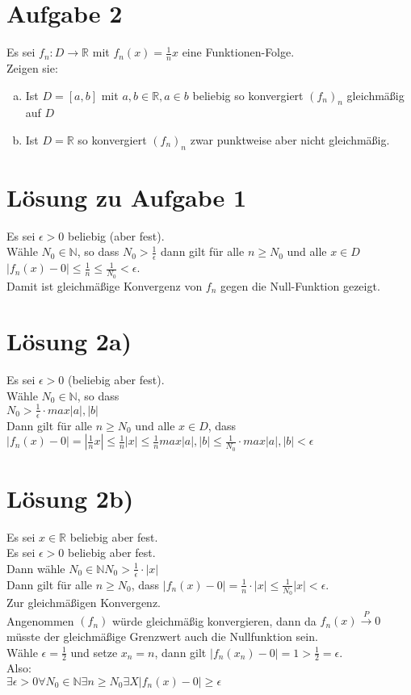\documentclass[11pt,a4paper]{article}
\begin{document}
		\section*{Aufgabe 2}
			Es sei $f_n:D\rightarrow\mathbb{R}$ mit $f_n(x) = \frac{1}{n}x$ eine Funktionen-Folge.\\
			Zeigen sie:\\
			\begin{enumerate}[a)]
				\item Ist $D=[a,b]$ mit $a,b\in \mathbb{R}, a\in b$ beliebig so konvergiert $(f_n)_n$ gleichmäßig auf $D$
				\item Ist $D=\mathbb{R}$ so konvergiert $(f_n)_n$ zwar punktweise aber nicht gleichmäßig.
			\end{enumerate}
		\section*{Lösung zu Aufgabe 1}
			Es sei $\epsilon >0$ beliebig (aber fest).\\
			 Wähle $N_0\in \mathbb{N}$, so dass $N_0>\frac{1}{\epsilon}$ dann gilt für alle $n\geq N_0$ und alle $x\in D$ $|f_n(x)-0|\leq\frac{1}{n}\leq\frac{1}{N_0}<\epsilon$.\\
			Damit ist gleichmäßige Konvergenz von $f_n$ gegen die Null-Funktion gezeigt.\\
		\section*{Lösung 2a)}
			Es sei $\epsilon > 0$ (beliebig aber fest).\\
			Wähle $N_0\in \mathbb{N}$, so dass\\
			$N_0>\frac{1}{\epsilon}\cdot max{|a|,|b|}$\\
			Dann gilt für alle $n\geq N_0$ und alle $x\in D$, dass\\
			$|f_n(x)-0|=|\frac{1}{n}x|\leq\frac{1}{n}|x|\leq\frac{1}{n}max{|a|,|b|}\leq\frac{1}{N_0}\cdot max{|a|,|b|}<\epsilon$
		\section*{Lösung 2b)}
		Es sei $x\in \mathbb{R}$ beliebig aber fest.\\
		Es sei $\epsilon >0$ beliebig aber fest.\\
		Dann wähle $N_0\in\mathbb{N} N_0>\frac{1}{\epsilon}\cdot|x|$\\
		Dann gilt für alle $n\geq N_0$, dass $|f_n(x)-0|=\frac{1}{n}\cdot|x|\leq\frac{1}{N_0}|x|<\epsilon$.\\
		Zur gleichmäßigen Konvergenz.\\
		Angenommen $(f_n)$ würde gleichmäßig konvergieren, dann da $f_n(x)\stackrel{P}{\rightarrow}0$ müsste der gleichmäßige Grenzwert auch die Nullfunktion sein.\\
		Wähle $\epsilon=\frac{1}{2}$ und setze $x_n=n$, dann gilt $|f_n(x_n)-0|=1>\frac{1}{2}=\epsilon$.\\
		Also:\\
		$\exists\epsilon >0\forall N_0\in\mathbb{N} \exists n\geq N_0 \exists X |f_n(x)-0|\geq \epsilon$
\end{document}
